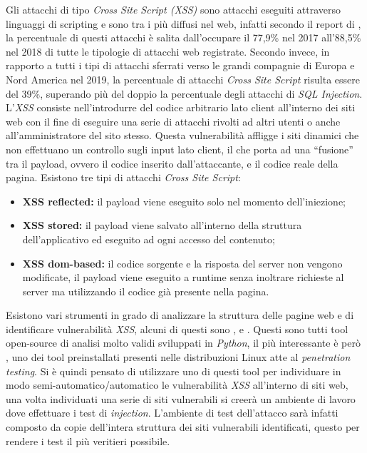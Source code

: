 \documentclass[
11pt, %
oneside, %
italian, %
onehalfspacing,%
headsepline, %
]{MastersDoctoralThesis} %
\newcommand\citen[1]{\citeauthor{#1} \citep{#1}}
\newcommand\citetitlen[1]{\citetitle{#1} \citep{#1}}
\begin{document}
Gli attacchi di tipo \emph{Cross Site Script (XSS)} sono attacchi eseguiti attraverso linguaggi di scripting e sono tra i più diffusi nel web, infatti secondo il report di \citen{PositiveTechnologiesReport}, la percentuale di questi attacchi è salita dall'occupare il 77,9\% nel 2017 all'88,5\% nel 2018 di tutte le tipologie di attacchi web registrate. Secondo \citen{PreciseSecurityReport} invece, in rapporto a tutti i tipi di attacchi sferrati verso le grandi compagnie di Europa e Nord America nel 2019, la percentuale di attacchi \emph{Cross Site Script} risulta essere del 39\%, superando più del doppio la percentuale degli attacchi di \emph{SQL Injection}.\\
L'\emph{XSS} consiste nell’introdurre del codice arbitrario lato client all'interno dei siti web con il fine di eseguire una serie di attacchi rivolti ad altri utenti o anche all'amministratore del sito stesso. Questa vulnerabilità affligge i siti dinamici che non effettuano un controllo sugli input lato client, il che porta ad una ``fusione'' tra il payload, ovvero il codice inserito dall'attaccante, e il codice reale della pagina. Esistono tre tipi di attacchi \emph{Cross Site Script}:
\begin{itemize}
  \item\textbf{XSS reflected:} il payload viene eseguito solo nel momento dell’iniezione;
  \item\textbf{XSS stored:} il payload viene salvato all'interno della struttura dell'applicativo ed eseguito ad ogni accesso del contenuto;
  \item\textbf{XSS dom-based:} il codice sorgente e la risposta del server non vengono modificate, il payload viene eseguito a runtime senza inoltrare richieste al server ma utilizzando il codice già presente nella pagina.
\end{itemize}
Esistono vari strumenti in grado di analizzare la struttura delle pagine web e di identificare vulnerabilità \emph{XSS}, alcuni di questi sono \citetitlen{XSStrike}, \citetitlen{Traxss} e \citetitlen{XSSer}. Questi sono tutti tool open-source di analisi molto validi sviluppati in \emph{Python}, il più interessante è però , uno dei tool preinstallati presenti nelle distribuzioni Linux atte al \emph{penetration testing}. Si è quindi pensato di utilizzare uno di questi tool per individuare in modo semi-automatico/automatico le vulnerabilità \emph{XSS} all'interno di siti web, una volta individuati una serie di siti vulnerabili si creerà un ambiente di lavoro dove effettuare i test di \emph{injection}. L'ambiente di test dell'attacco sarà infatti composto da copie dell'intera struttura dei siti vulnerabili identificati, questo per rendere i test il più veritieri possibile.\\
\end{document}
